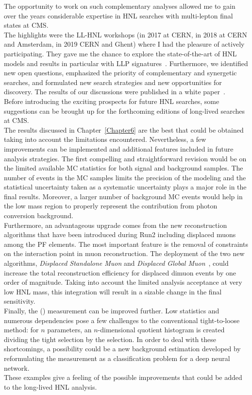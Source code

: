 The opportunity to work on such complementary analyses
allowed me to gain over the years considerable expertise in HNL
searches with multi-lepton final states at CMS.\\
The highlights were the LL-HNL workshops (in 2017 at CERN, in 2018 at
CERN and
Amsterdam, in 2019 CERN and Ghent) where I had the pleasure
of actively participating.
 They gave me the chance to explore the 
state-of-the-art of HNL models and results in particular with LLP
signatures~\cite{Alimena_2020}. Furthermore, we identified new open
questions, emphasized the priority of complementary and synergetic
searches, and formulated new search strategies and new opportunities
for discovery. The results of our discussions were published in a
white paper~\cite{Alimena_2020}.\\


Before introducing the exciting prospects for future HNL searches,
some suggestions can be brought up for the forthcoming editions
of long-lived \hnl searches at CMS.\\
The results discussed in Chapter~\ref{Chapter6} are the best that could be obtained taking into
account the limitations encountered. Nevertheless, a few improvements can
be implemented and additional features included in future analysis
strategies. The first compelling and straightforward revision would be on the limited
available MC statistics for both signal and background samples. The number of
events in the MC samples limits the precision of the modeling and the
 statistical uncertainty taken as a systematic uncertainty plays a
 major role in the final results. Moreover, a larger number of background MC
 events would help in the low mass region to properly represent the
 contribution from photon conversion background.\\
Furthermore, an advantageous upgrade comes from the new reconstruction
algorithms that have been introduced during Run2 including displaced
muons among the PF elements.
The most important feature is the removal of constraints on the
interaction point in muon reconstruction. The deployment of the two new algorithms,
\emph{Displaced Standalone Muon} and \emph{Displaced Global Muon}~\cite{CMS-DP-2015-015},
could increase the total reconstruction efficiency for displaced dimuon
events by one order of magnitude. Taking into account the limited analysis
acceptance at very low HNL mass, this integration will
result in a sizable change in the final sensitivity.\\
Finally, the \Dfr (\dfr) measurement can be improved further. Low statistics and numerous \dfr dependencies
pose a few challenges to the conventional tight-to-loose method: for
$n$ \dfr parameters, an $n$-dimensional quotient histogram is created
dividing the tight selection by the \fo selection. In order to deal
with these shortcomings, a possibility could be a new background
estimation developed by
reformulating the \dfr measurement as a classification problem
for a deep neural network.\\
These examples give a feeling of the possible improvements that could
be added to the long-lived HNL analysis.\\

